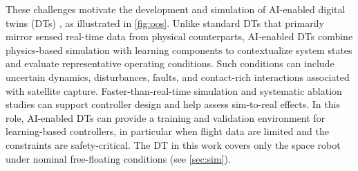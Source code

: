 \documentclass{ieeeaccess}
\begin{document}
These challenges motivate the development and simulation of AI-enabled digital twins (DTs)
\cite{kaigom2025deep,la2025deep}, as illustrated in \cref{fig:oos}. Unlike standard DTs that
primarily mirror sensed
real-time data from physical counterparts, AI-enabled DTs combine physics-based simulation with
learning components to contextualize system states and evaluate representative operating conditions.
Such conditions can include uncertain dynamics, disturbances, faults, and contact-rich
interactions associated with satellite capture. Faster-than-real-time simulation and systematic ablation
studies can support controller design and help assess sim-to-real effects. In this role, AI-enabled DTs
can provide a training and validation environment for learning-based controllers, in particular when
flight data are limited and the constraints are safety-critical. The DT in this work covers
only the space robot under nominal free-floating conditions (see \cref{sec:sim}).
\end{document}
